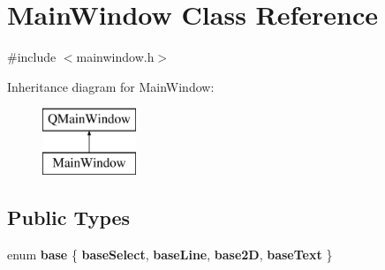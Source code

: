 \hypertarget{classMainWindow}{\section{Main\-Window Class Reference}
\label{classMainWindow}
}


{\ttfamily \#include $<$mainwindow.\-h$>$}

Inheritance diagram for Main\-Window\-:\begin{figure}[H]
\begin{center}
\leavevmode
\includegraphics[height=2.000000cm]{classMainWindow}
\end{center}
\end{figure}
\subsection*{Public Types}
\begin{DoxyCompactItemize}
\item 
enum {\bfseries base} \{ {\bfseries base\-Select}, 
{\bfseries base\-Line}, 
{\bfseries base2\-D}, 
{\bfseries base\-Text}
 \}
\end{DoxyCompactItemize}
